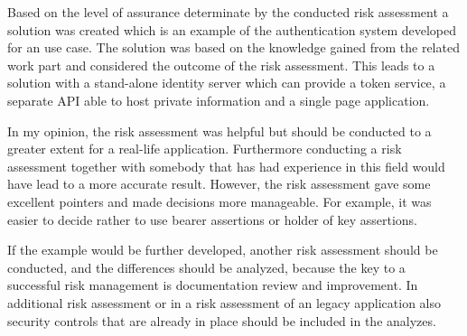 Based on the level of assurance determinate by the conducted risk assessment a solution was created which is an example of the authentication system developed for an use case. The solution was based on the knowledge gained from the related work part and considered the outcome of the risk assessment. This leads to a solution with a stand-alone identity server which can provide a token service, a separate API able to host private information and a single page application. 

In my opinion, the risk assessment was helpful but should be conducted to a greater extent for a real-life application. Furthermore conducting a risk assessment together with somebody that has had experience in this field would have lead to a more accurate result. However, the risk assessment gave some excellent pointers and made decisions more manageable. For example, it was easier to decide rather to use bearer assertions or holder of key assertions. 

If the example would be further developed, another risk assessment should be conducted, and the differences should be analyzed, because the key to a successful risk management is documentation review and improvement. In additional risk assessment or in a risk assessment of an legacy application also security controls that are already in place should be included in the analyzes. 

\chapterend
